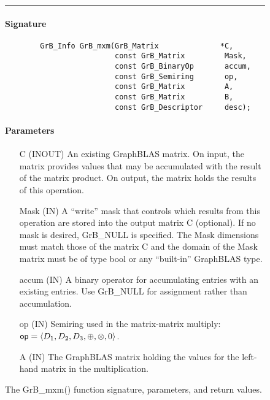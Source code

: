 \begin{figure*}[ht!]
\hrule
	\caption{The {\sf GrB\_mxm()} function signature, parameters, and return values.}
\label{Fig:mxm}
\paragraph{Signature}
\footnotesize
\begin{verbatim}
        GrB_Info GrB_mxm(GrB_Matrix              *C,
                         const GrB_Matrix         Mask,
                         const GrB_BinaryOp       accum,
                         const GrB_Semiring       op,
                         const GrB_Matrix         A, 
                         const GrB_Matrix         B,
                         const GrB_Descriptor     desc);
\end{verbatim}

\paragraph{Parameters}

\begin{itemize}[leftmargin=1.1in]
    \item[{\sf C}]    ({\sf INOUT}) An existing GraphBLAS matrix. On
    input, the matrix provides values that may be accumulated with the
    result of the matrix product.   On output, the matrix holds the
    results of this operation.

    \item[{\sf Mask}] ({\sf IN}) A ``write'' mask that controls which
    results from this operation are stored into the output matrix
    {\sf C} (optional).  If no mask is desired,  {\sf GrB\_NULL}
    is specified. The Mask dimensions must match those of the
    matrix {\sf C} and the domain of the {\sf Mask} matrix must be
    of type {\sf bool} or any ``built-in'' GraphBLAS type.

    \item[{\sf accum}] ({\sf IN}) A binary operator for accumulating entries
    with an existing  entries.  Use {\sf GrB\_NULL} for assignment rather than accumulation.

    \item[{\sf op}] ({\sf IN}) Semiring used in the matrix-matrix
    multiply: ${\sf op}=\langle D_1,D_2,D_3,\oplus,\otimes,0 \rangle$.

    \item[{\sf A}] ({\sf IN}) The GraphBLAS matrix holding the values
    for the left-hand matrix in the multiplication.


\end{itemize}
\end{figure*}
